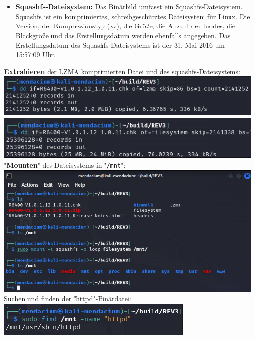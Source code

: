 \documentclass{article}
\begin{document}
\begin{itemize}
		\item \textbf{Squashfs-Dateisystem:} Das Binärbild umfasst ein Squashfs-Dateisystem. Squashfs ist ein komprimiertes, schreibgeschütztes Dateisystem für Linux. Die Version, der Kompressionstyp (xz), die Größe, die Anzahl der Inodes, die Blockgröße und das Erstellungsdatum werden ebenfalls angegeben.
		Das Erstellungsdatum des Squashfs-Dateisystems ist der 31. Mai 2016 um 15:57:09 Uhr.
	\end{itemize}
	
	\noindent\textbf{Extrahieren} der LZMA komprimierten Datei und des squashfs-Dateisystems:\\
	\includegraphics[width=0.4\linewidth]{"pictures/1.3 extract lzma.png"}
	\includegraphics[width=0.4\linewidth]{"pictures/1.4 extract filesystem.png"}\\
	
	
	\noindent"\textbf{Mounten}" des Dateisystems in "\texttt{/mnt}":\\
	\includegraphics[width=0.4\linewidth]{"pictures/1.5 mount squashfs.png"}\\
	Suchen und finden der "httpd"-Binärdatei:\\
	\includegraphics[width=0.4\linewidth]{"pictures/1.6 find httpd.png"}\\

	\pagebreak
	
\end{document}
